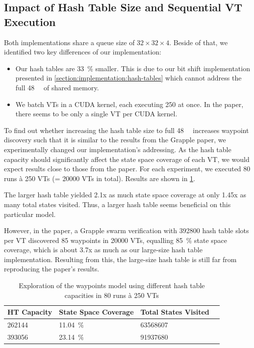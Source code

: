 \documentclass[
fancyheadings, %
%
%
]{stsreprt}
\begin{document}
\subsection{Impact of Hash Table Size and Sequential VT Execution}

Both implementations share a queue size of $32 \times 32 \times 4$.
Beside of that, we identified two key differences of our implementation:

\begin{itemize}
    \item Our hash tables are \SI{33}{\percent} smaller.
          This is due to our bit shift implementation presented in \cref{section:implementation:hash-tables} which cannot address the full \SI{48}{\kibi\byte} of shared memory.
    \item We batch VTs in a CUDA kernel, each executing 250 at once.
          In the paper, there seems to be only a single VT per CUDA kernel.
\end{itemize}

To find out whether increasing the hash table size to full \SI{48}{\kibi\byte} increases waypoint discovery such that it is similar to the results from the Grapple paper, we experimentally changed our implementation's addressing.
As the hash table capacity should significantly affect the state space coverage of each VT, we would expect results close to those from the paper.
For each experiment, we executed 80 runs à 250 VTs (= \num{20000} VTs in total).
Results are shown in \cref{table:EXP-02}.

The larger hash table yielded 2.1x as much state space coverage at only 1.45x as many total states visited.
Thus, a larger hash table seems beneficial on this particular model.

However, in the paper, a Grapple swarm verification with \num{392800} hash table slots per VT discovered 85 waypoints in \num{20000} VTs, equalling \SI{85}{\percent} state space coverage, which is about 3.7x as much as our large-size hash table implementation.
Resulting from this, the large-size hash table is still far from reproducing the paper's results.

\begin{table}
    \caption{Exploration of the waypoints model using different hash table capacities in 80 runs à 250 VTs}
    \label{table:EXP-02}
    \centering
    \begin{tabular}{l l l l}
        \toprule
        HT Capacity  & State Space Coverage & Total States Visited \\
        \midrule
        \num{262144} & \SI{11.04}{\percent} & \num{63568607}       \\
        \num{393056} & \SI{23.14}{\percent} & \num{91937680}       \\
        \bottomrule
    \end{tabular}
\end{table}
\end{document}
